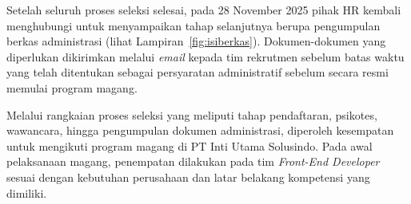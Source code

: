 Setelah seluruh proses seleksi selesai, pada 28 November 2025 pihak HR kembali
menghubungi untuk menyampaikan tahap selanjutnya berupa pengumpulan berkas
administrasi (lihat Lampiran~\ref{fig:isiberkas}). Dokumen-dokumen yang
diperlukan dikirimkan melalui \textit{email} kepada tim rekrutmen sebelum batas
waktu yang telah ditentukan sebagai persyaratan administratif sebelum secara
resmi memulai program magang.

Melalui rangkaian proses seleksi yang meliputi tahap pendaftaran, psikotes,
wawancara, hingga pengumpulan dokumen administrasi, diperoleh kesempatan untuk
mengikuti program magang di PT Inti Utama Solusindo. Pada awal pelaksanaan
magang, penempatan dilakukan pada tim \textit{Front-End Developer} sesuai
dengan kebutuhan perusahaan dan latar belakang kompetensi yang dimiliki.